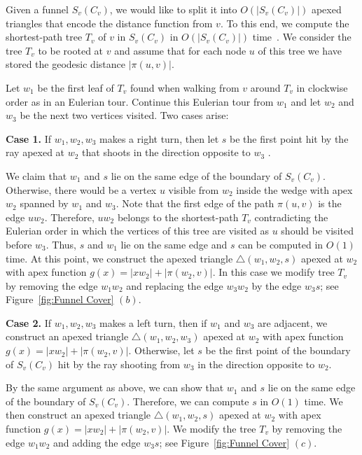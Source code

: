 \documentclass[a4paper,UKenglish]{lipics}
\newcommand{\fn}[2]{\ensuremath{S_{\scriptscriptstyle #1}(#2)}}
\newcommand{\g}[2]{\ensuremath{|\pi(#1, #2)|}}
\newcommand{\p}[2]{\ensuremath{\pi(#1, #2)}}
\newcommand{\luis}[2][says]{}
\newcommand{\mati}[2][says]{}
\begin{document}
Given a funnel $\fn{v}{C_v}$, we would like to split it into $O(|\fn{v}{C_v}|)$ apexed triangles that encode the distance function from $v$.
To this end, we compute the shortest-path tree $T_v$ of $v$ in $\fn{v}{C_v}$ in $O(|\fn{v}{C_v}|)$ time~\cite{guibasShortestPathQueries}.
We consider the tree $T_v$ to be rooted at $v$ and assume that for each node $u$ of this tree 
we have stored the geodesic distance $\g{u}{v}$. 

Let $w_1$ be the first leaf of $T_v$ found when walking from $v$ around $T_v$ in clockwise order as in an Eulerian tour.
Continue this Eulerian tour from $w_1$ and let $w_2$ and $w_3$ be the next two vertices visited. Two cases arise:

\textbf{Case 1.} If $w_1, w_2, w_3$ makes a right turn, then let $s$ be the first point hit by the ray apexed at $w_2$ that shoots in the direction opposite to $w_3$\mati{again, I think htat w2 and w3 are reversed} \luis{I don't see this. In the figures we have first Case 2 where $w_1,w_2,w_3$ make a right turn and then Case 1 where they make a left turn in the 5th drawing}. 

We claim that $w_1$ and $s$ lie on the same edge of the boundary of $\fn{v}{C_v}$. 
Otherwise, there would be a vertex $u$ visible from $w_2$ inside the wedge with apex $w_2$ spanned by $w_1$ and $w_3$.
Note that the first edge of the path $\p{u}{v}$ is the edge $uw_2$. Therefore, $uw_2$ belongs to the shortest-path $T_v$ contradicting the Eulerian order in which the vertices of this tree are visited as $u$ should be visited before $w_3$. Thus, $s$ and $w_1$ lie on the same edge and $s$ can be computed in $O(1)$ time.
At this point, we construct the apexed triangle $\triangle(w_1, w_2, s)$ apexed at $w_2$ with apex function $g(x) = |x w_2| + \g{w_2}{v}$.
In this case we modify tree $T_v$ by removing the edge $w_1w_2$ and replacing the edge $w_3w_2$ by the edge $w_3s$; see Figure~\ref{fig:Funnel Cover} $(b)$.


\textbf{Case 2.} If $w_1, w_2, w_3$ makes a left turn, then if $w_1$ and $w_3$ are adjacent, we construct an apexed triangle $\triangle(w_1, w_2, w_3)$ apexed at $w_2$ with apex function $g(x) = |x w_2| + \g{w_2}{v}$.
Otherwise, let $s$ be the first point of the boundary of $\fn{v}{C_v}$ hit by the ray shooting from $w_3$ in the direction opposite to $w_2$. 

By the same argument as above, we can show that $w_1$ and $s$ lie on the same edge of the boundary of $\fn{v}{C_v}$. Therefore, we can compute $s$ in $O(1)$ time. 
We then construct an apexed triangle $\triangle(w_1, w_2, s)$ apexed at $w_2$ with apex function $g(x) = |x w_2| + \g{w_2}{v}$.
We modify the tree $T_v$ by removing the edge $w_1w_2$ and adding the edge $w_3s$; see Figure~\ref{fig:Funnel Cover} $(c)$.
\end{document}
